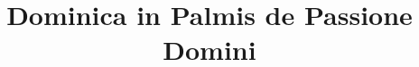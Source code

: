 \documentclass[17pt]{extarticle}
\begin{document}
\title{Dominica in Palmis de Passione Domini}
\makereadingtitle

\end{document}
